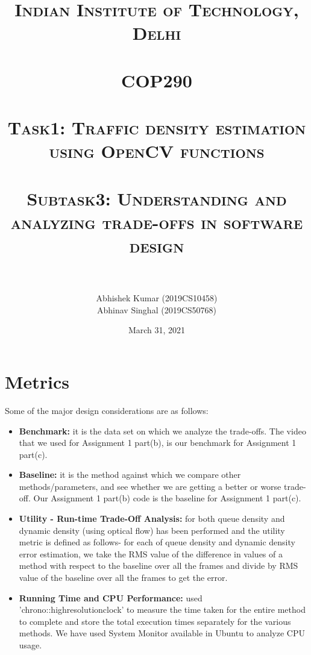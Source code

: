 \documentclass[paper=a4, fontsize = 12pt]{scrartcl}
\title{
		\usefont{OT1}{bch}{b}{n}
		\normalfont \normalsize \textsc{Indian Institute of Technology, Delhi} \\ [25pt]
		\horrule{0.5pt} \\[0.4cm]
		\normalfont \huge \textsc{COP290}  \\

		\normalfont \normalsize \textsc{\\ Task1: Traffic density estimation using OpenCV functions} \\
		\normalfont \normalsize \textsc{\\ Subtask3: Understanding and analyzing trade-offs in software design} \\
		\horrule{2pt} \\[0.5cm]
}
\author{
		\normalfont 								\normalsize
		Abhishek Kumar (2019CS10458) \\ [-3pt]		\normalsize
        Abhinav Singhal (2019CS50768) 	
}
\date{\normalfont \normalsize March 31, 2021 }
\numberwithin{equation}{section}		%
\numberwithin{figure}{section}			%
\numberwithin{table}{section}				%
\begin{document}
\maketitle


\section{Metrics}
Some of the major design considerations are as follows: 
\begin{itemize}
    \item \textbf{Benchmark:} it is the data set on which we analyze the trade-offs. The video that we used for Assignment 1 part(b), is our benchmark for Assignment 1 part(c). 
    
    \item \textbf{Baseline:} it is the method against which we compare other methods/parameters, and see whether we are getting a better or worse trade-off. Our Assignment 1 part(b) code is the baseline for Assignment 1 part(c). 
    
    \item \textbf{Utility - Run-time Trade-Off Analysis:} for both queue density and dynamic density (using optical flow) has been performed and the utility metric is defined as follows- for each of queue density and dynamic density error estimation, we take the RMS value of the difference in values of a method with respect to the baseline over all the frames and divide by RMS value of the baseline over all the frames to get the error. 
    
    \item \textbf{Running Time and CPU Performance:} used 'chrono::high\textunderscore{}resolution\textunderscore{}clock' to measure the time taken for the entire method to complete and store the total execution times separately for the various methods. We have used System Monitor available in Ubuntu to analyze CPU usage. 
    
\end{itemize}
\end{document}
